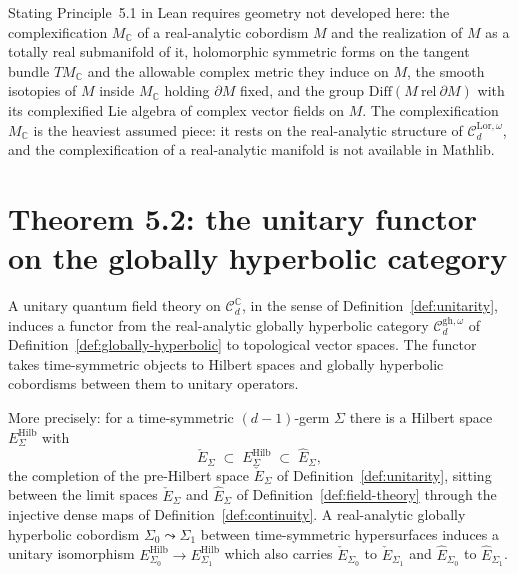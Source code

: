Stating Principle~5.1 in Lean requires geometry not developed here: the
complexification $M_{\mathbb C}$ of a real-analytic cobordism $M$ and the
realization of $M$ as a totally real submanifold of it, holomorphic symmetric forms
on the tangent bundle $TM_{\mathbb C}$ and the allowable complex metric they induce
on $M$, the smooth isotopies of $M$ inside $M_{\mathbb C}$ holding $\partial M$
fixed, and the group $\mathrm{Diff}(M \ \mathrm{rel}\ \partial M)$ with its
complexified Lie algebra of complex vector fields on $M$. The complexification
$M_{\mathbb C}$ is the heaviest assumed piece: it rests on the real-analytic
structure of $\mathcal C_d^{\mathrm{Lor},\omega}$, and the complexification of a
real-analytic manifold is not available in Mathlib.

\section{Theorem 5.2: the unitary functor on the globally hyperbolic category}

\begin{theorem}
  \label{thm:unitary-gh}
  \notready
  A unitary quantum field theory on $\mathcal C_d^{\mathbb C}$, in the sense of
  Definition~\ref{def:unitarity}, induces a functor from the real-analytic globally
  hyperbolic category $\mathcal C_d^{\mathrm{gh},\omega}$ of
  Definition~\ref{def:globally-hyperbolic} to topological vector spaces. The functor
  takes time-symmetric objects to Hilbert spaces and globally hyperbolic cobordisms
  between them to unitary operators.

  More precisely: for a time-symmetric $(d-1)$-germ $\Sigma$ there is a Hilbert space
  $E_{\Sigma}^{\mathrm{Hilb}}$ with
  \[ \check E_{\Sigma} \;\subset\; E_{\Sigma}^{\mathrm{Hilb}} \;\subset\; \hat E_{\Sigma}, \]
  the completion of the pre-Hilbert space $\check E_{\Sigma}$ of
  Definition~\ref{def:unitarity}, sitting between the limit spaces $\check E_{\Sigma}$
  and $\hat E_{\Sigma}$ of Definition~\ref{def:field-theory} through the injective
  dense maps of Definition~\ref{def:continuity}. A real-analytic globally hyperbolic
  cobordism $\Sigma_0 \leadsto \Sigma_1$ between time-symmetric hypersurfaces induces
  a unitary isomorphism
  $E_{\Sigma_0}^{\mathrm{Hilb}} \to E_{\Sigma_1}^{\mathrm{Hilb}}$ which also carries
  $\check E_{\Sigma_0}$ to $\check E_{\Sigma_1}$ and $\hat E_{\Sigma_0}$ to
  $\hat E_{\Sigma_1}$.
\end{theorem}

